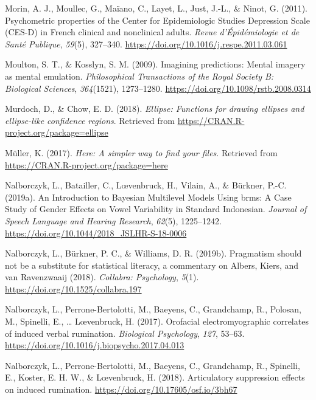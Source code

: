 \documentclass[a4paper,12pt,twoside,openright,oldfontcommands]{memoir}
\begin{document}
\leavevmode\hypertarget{ref-morin_psychometric_2011}{}%
Morin, A. J., Moullec, G., Maïano, C., Layet, L., Just, J.-L., \& Ninot, G. (2011). Psychometric properties of the Center for Epidemiologic Studies Depression Scale (CES-D) in French clinical and nonclinical adults. \emph{Revue d'Épidémiologie et de Santé Publique}, \emph{59}(5), 327--340. \url{https://doi.org/10.1016/j.respe.2011.03.061}

\leavevmode\hypertarget{ref-moulton_imagining_2009}{}%
Moulton, S. T., \& Kosslyn, S. M. (2009). Imagining predictions: Mental imagery as mental emulation. \emph{Philosophical Transactions of the Royal Society B: Biological Sciences}, \emph{364}(1521), 1273--1280. \url{https://doi.org/10.1098/rstb.2008.0314}

\leavevmode\hypertarget{ref-R-ellipse}{}%
Murdoch, D., \& Chow, E. D. (2018). \emph{Ellipse: Functions for drawing ellipses and ellipse-like confidence regions}. Retrieved from \url{https://CRAN.R-project.org/package=ellipse}

\leavevmode\hypertarget{ref-R-here}{}%
Müller, K. (2017). \emph{Here: A simpler way to find your files}. Retrieved from \url{https://CRAN.R-project.org/package=here}

\leavevmode\hypertarget{ref-nalborczyk_introduction_2019}{}%
Nalborczyk, L., Batailler, C., Lœvenbruck, H., Vilain, A., \& Bürkner, P.-C. (2019a). An Introduction to Bayesian Multilevel Models Using brms: A Case Study of Gender Effects on Vowel Variability in Standard Indonesian. \emph{Journal of Speech Language and Hearing Research}, \emph{62}(5), 1225--1242. \url{https://doi.org/10.1044/2018_JSLHR-S-18-0006}

\leavevmode\hypertarget{ref-nalborczyk_pragmatism_2019}{}%
Nalborczyk, L., Bürkner, P. C., \& Williams, D. R. (2019b). Pragmatism should not be a substitute for statistical literacy, a commentary on Albers, Kiers, and van Ravenzwaaij (2018). \emph{Collabra: Psychology}, \emph{5}(1). \url{https://doi.org/10.1525/collabra.197}

\leavevmode\hypertarget{ref-nalborczyk_orofacial_2017}{}%
Nalborczyk, L., Perrone-Bertolotti, M., Baeyens, C., Grandchamp, R., Polosan, M., Spinelli, E., \ldots{} Lœvenbruck, H. (2017). Orofacial electromyographic correlates of induced verbal rumination. \emph{Biological Psychology}, \emph{127}, 53--63. \url{https://doi.org/10.1016/j.biopsycho.2017.04.013}

\leavevmode\hypertarget{ref-nalborczyk_articulatory_2018}{}%
Nalborczyk, L., Perrone-Bertolotti, M., Baeyens, C., Grandchamp, R., Spinelli, E., Koster, E. H. W., \& Lœvenbruck, H. (2018). Articulatory suppression effects on induced rumination. \url{https://doi.org/10.17605/osf.io/3bh67}
\end{document}
